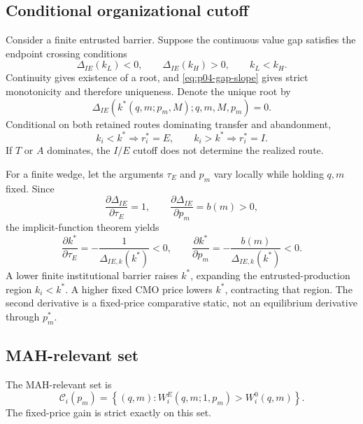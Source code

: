 \subsection{Conditional organizational cutoff}
\label{subsec:p04-cutoff}

Consider a finite entrusted barrier. Suppose the continuous value gap
satisfies the endpoint crossing conditions
\[
  \Delta_{IE}(k_L)<0,
  \qquad
  \Delta_{IE}(k_H)>0,
  \qquad k_L<k_H.
\]
Continuity gives existence of a root, and
\eqref{eq:p04-gap-slope} gives strict monotonicity and therefore uniqueness.
Denote the unique root by
\begin{equation}
  \Delta_{IE}\!\left(k^*(q,m;p_m,M);q,m,M,p_m\right)=0.
  \label{eq:p04-cutoff}
\end{equation}
Conditional on both retained routes dominating transfer and abandonment,
\begin{equation}
  k_i<k^*\Rightarrow r_i^*=E,
  \qquad
  k_i>k^*\Rightarrow r_i^*=I.
  \label{eq:p04-cutoff-sorting}
\end{equation}
If \(T\) or \(A\) dominates, the \(I/E\) cutoff does not determine the
realized route.

For a finite wedge, let the arguments \(\tau_E\) and \(p_m\) vary locally
while holding \(q,m\) fixed. Since
\[
  \frac{\partial\Delta_{IE}}{\partial\tau_E}=1,
  \qquad
  \frac{\partial\Delta_{IE}}{\partial p_m}=b(m)>0,
\]
the implicit-function theorem yields
\begin{equation}
  \frac{\partial k^*}{\partial\tau_E}
  =
  -\frac{1}{\Delta_{IE,k}(k^*)}<0,
  \qquad
  \frac{\partial k^*}{\partial p_m}
  =
  -\frac{b(m)}{\Delta_{IE,k}(k^*)}<0.
  \label{eq:p04-cutoff-derivatives}
\end{equation}
A lower finite institutional barrier raises \(k^*\), expanding the
entrusted-production region \(k_i<k^*\). A higher fixed CMO price lowers
\(k^*\), contracting that region. The second derivative is a fixed-price
comparative static, not an equilibrium derivative through \(p_m^*\).

\subsection{MAH-relevant set}
\label{subsec:p04-relevant-set}

The MAH-relevant set is
\begin{equation}
  \mathcal C_i(p_m)
  =
  \left\{(q,m):
  W_i^E(q,m;1,p_m)>W_i^0(q,m)
  \right\}.
  \label{eq:p04-relevant-set}
\end{equation}
The fixed-price gain is strict exactly on this set.

